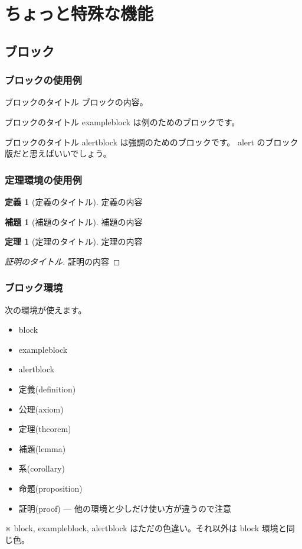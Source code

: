 \documentclass[dvipdfmx,cjk,xcolor=dvipsnames,envcountsect,notheorems,12pt]{beamer}
\theoremstyle{definition}
\newtheorem{definition}{定義}
\newtheorem{theorem}{定理}
\newtheorem{lemma}{補題}
\begin{document}
\section{ちょっと特殊な機能}

\subsection{ブロック}

\begin{frame}
  \frametitle{ブロックの使用例}
  \begin{block}{ブロックのタイトル}
    ブロックの内容。
  \end{block}
  \vfill
  \begin{exampleblock}{ブロックのタイトル}
    exampleblock は例のためのブロックです。
  \end{exampleblock}
  \vfill
  \begin{alertblock}{ブロックのタイトル}
    alertblock は強調のためのブロックです。
    alert のブロック版だと思えばいいでしょう。
  \end{alertblock}
\end{frame}

\begin{frame}
  \frametitle{定理環境の使用例}
  \renewcommand{\thedefinition}{1.1}%
  \begin{definition}[定義のタイトル]
    定義の内容
  \end{definition}
  \vfill
  \renewcommand{\thelemma}{2.2}%
  \begin{lemma}[補題のタイトル]
    補題の内容
  \end{lemma}
  \vfill
  \renewcommand{\thetheorem}{3.4}%
  \begin{theorem}[定理のタイトル]
    定理の内容
  \end{theorem}
  \vfill
  \begin{proof}[証明のタイトル]
    証明の内容
  \end{proof}
\end{frame}

\begin{frame}
  \frametitle{ブロック環境}
  次の環境が使えます。
  \begin{itemize}
  \item block
  \item exampleblock
  \item alertblock
  \item 定義(definition)
  \item 公理(axiom)
  \item 定理(theorem)
  \item 補題(lemma)
  \item 系(corollary)
  \item 命題(proposition)
  \item 証明(proof) --- 他の環境と少しだけ使い方が違うので注意
  \end{itemize}
  ※ block, exampleblock, alertblock はただの色違い。それ以外は block 環境と同じ色。
\end{frame}
\end{document}
